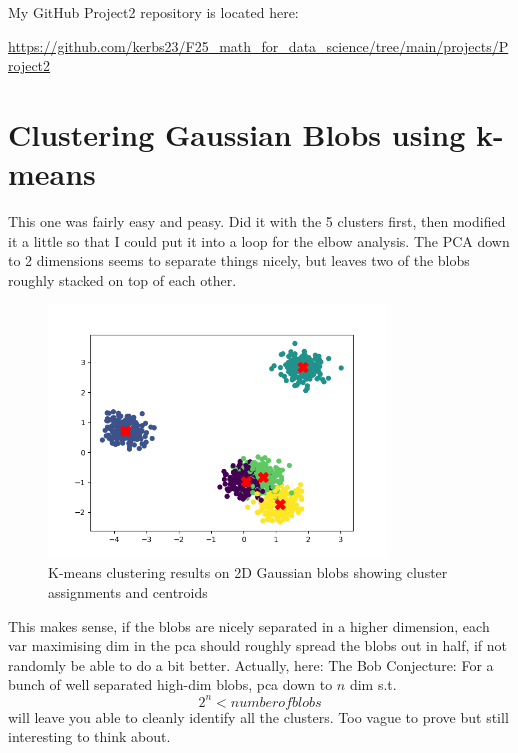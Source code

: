 \documentclass[letterpaper, 11pt]{amsart}
\begin{document}


\noindent My GitHub Project2 repository is located here:
\begin{center}
    \url{https://github.com/kerbs23/F25_math_for_data_science/tree/main/projects/Project2}
\end{center}


\section{Clustering Gaussian Blobs using k-means}

This one was fairly easy and peasy. Did it with the 5 clusters first, then modified it a little so that I could put it into a loop for the elbow analysis.
The PCA down to 2 dimensions seems to separate things nicely, but leaves two of the blobs roughly stacked on top of each other.

\begin{figure}[h]
\centering
\includegraphics[width=0.8\textwidth]{plots/KMeans_plot.png}
\caption{K-means clustering results on 2D Gaussian blobs showing cluster assignments and centroids}
\end{figure}

This makes sense, if the blobs are nicely separated in a higher dimension, each var maximising dim in the pca should roughly spread the blobs out in half, if not randomly be able to do a bit better.
Actually, here: The Bob Conjecture: For a bunch of well separated high-dim blobs, pca down to $n$ dim s.t. $$2^n < number of blobs$$ will leave you able to cleanly identify all the clusters.
Too vague to prove but still interesting to think about.
\end{document}
